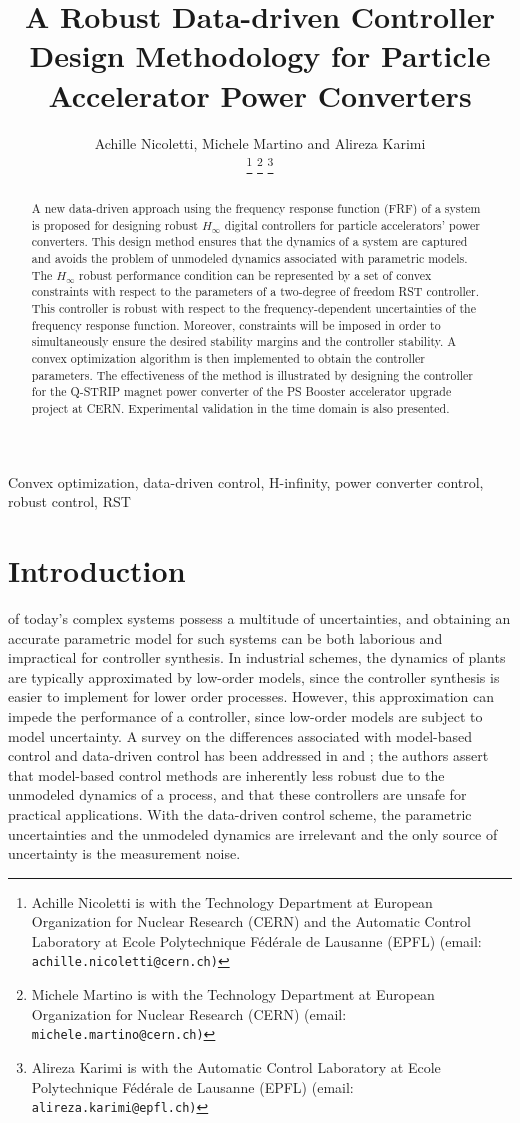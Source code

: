 \documentclass[journal]{IEEEtran}
\title{\LARGE \bf A Robust Data-driven Controller Design Methodology for Particle Accelerator Power Converters}
\author{Achille Nicoletti, Michele Martino and Alireza Karimi%

\thanks{Achille Nicoletti is with the Technology Department at
European Organization for Nuclear Research (CERN) and the Automatic Control Laboratory at
Ecole Polytechnique F\'{e}d\'{e}rale de Lausanne (EPFL) (email: \tt\small achille.nicoletti@cern.ch)}%
\thanks{Michele Martino is with the Technology Department at
European Organization for Nuclear Research (CERN) (email: \tt\small michele.martino@cern.ch)}%
\thanks{Alireza Karimi is with the Automatic Control Laboratory at
Ecole Polytechnique F\'{e}d\'{e}rale de Lausanne (EPFL) (email: \tt\small alireza.karimi@epfl.ch)}%
}
\begin{document}
\maketitle
\thispagestyle{empty}
\pagestyle{empty}

\begin{abstract}
A new data-driven approach using the frequency response function (FRF) of a system is proposed for designing robust $H_{\infty}$ digital controllers for particle accelerators' power converters. This design method ensures that the dynamics of a system are captured and avoids the problem of unmodeled dynamics associated with parametric models. The $H_{\infty}$ robust performance condition can be represented by a set of convex constraints with respect to the parameters of a two-degree of freedom RST controller. This controller is robust with respect to the frequency-dependent uncertainties of the frequency response function. Moreover, constraints will be imposed in order to simultaneously ensure the desired stability margins and the controller stability. A convex optimization algorithm is then implemented to obtain the controller parameters. The effectiveness of the method is illustrated by designing the controller for the Q-STRIP magnet power converter of the PS Booster accelerator upgrade project at CERN. Experimental validation in the time domain is also presented. 
\end{abstract}

\begin{IEEEkeywords}
Convex optimization, data-driven control, H-infinity, power converter control, robust control, RST %
\end{IEEEkeywords}


\section{Introduction}
 of today's  complex systems possess a multitude of uncertainties, and obtaining an accurate parametric model for such systems can be both laborious and impractical for controller synthesis. In industrial schemes, the dynamics of plants are typically approximated by low-order models, since the controller synthesis is easier to implement for lower order processes. However, this approximation can impede the  performance of a controller, since low-order models are subject to model uncertainty. A survey on the differences associated with model-based control and data-driven control has been addressed in \cite{HW13} and \cite{BCE12}; the authors assert that model-based control methods are inherently less robust due to the unmodeled dynamics of a process, and that these controllers are unsafe for practical applications. With the data-driven control scheme, the parametric uncertainties and the unmodeled dynamics are irrelevant and the only source of uncertainty is the measurement noise. 
\end{document}
